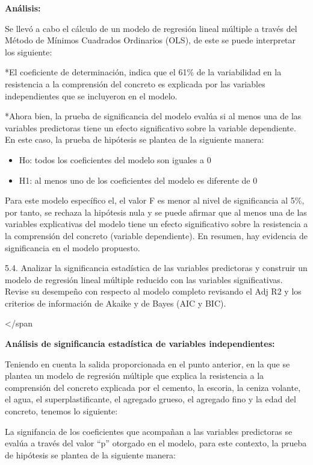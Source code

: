 \documentclass[11pt]{article}
\providecommand{\tightlist}{%
      \setlength{\itemsep}{0pt}\setlength{\parskip}{0pt}}
\begin{document}
    \textbf{Análisis:}

Se llevó a cabo el cálculo de un modelo de regresión lineal múltiple a
través del Método de Mínimos Cuadrados Ordinarios (OLS), de este se
puede interpretar los siguiente:

*El coeficiente de determinación, indica que el 61\% de la variabilidad
en la resistencia a la comprensión del concreto es explicada por las
variables independientes que se incluyeron en el modelo.

*Ahora bien, la prueba de significancia del modelo evalúa si al menos
una de las variables predictoras tiene un efecto significativo sobre la
variable dependiente. En este caso, la prueba de hipótesis se plantea de
la siguiente manera:

\begin{itemize}
\tightlist
\item
  Ho: todos los coeficientes del modelo son iguales a 0
\item
  H1: al menos uno de los coeficientes del modelo es diferente de 0
\end{itemize}

Para este modelo específico el, el valor F es menor al nivel de
significancia al 5\%, por tanto, se rechaza la hipótesis nula y se puede
afirmar que al menos una de las variables explicativas del modelo tiene
un efecto significativo sobre la resistencia a la comprensión del
concreto (variable dependiente). En resumen, hay evidencia de
significancia en el modelo propuesto.

    5.4. Analizar la significancia estadística de las variables predictoras
y construir un modelo de regresión lineal múltiple reducido con las
variables significativas. Revise su desempeño con respecto al modelo
completo revisando el Adj R2 y los criterios de información de Akaike
y de Bayes (AIC y BIC).

\textless/span

    \textbf{Análisis de significancia estadística de variables
independientes:}

Teniendo en cuenta la salida proporcionada en el punto anterior, en la
que se plantea un modelo de regresión múltiple que explica la
resistencia a la comprensión del concreto explicada por el cemento, la
escoria, la ceniza volante, el agua, el superplastificante, el agregado
grueso, el agregado fino y la edad del concreto, tenemos lo siguiente:

La signifancia de los coeficientes que acompañan a las variables
predictoras se evalúa a través del valor ``p'' otorgado en el modelo,
para este contexto, la prueba de hipótesis se plantea de la siguiente
manera:
\end{document}
